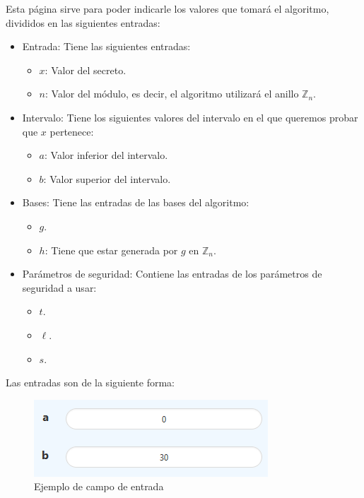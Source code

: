Esta página sirve para poder indicarle los valores que tomará el algoritmo, divididos en las siguientes entradas:
\begin{itemize}
    \item Entrada: Tiene las siguientes entradas:
    \begin{itemize}
        \item $x$: Valor del secreto.
        \item $n$: Valor del módulo, es decir, el algoritmo utilizará el anillo $\mathbb{Z}_{n}$.
    \end{itemize}
    \item Intervalo: Tiene los siguientes valores del intervalo en el que queremos probar que $x$ pertenece:
    \begin{itemize}
        \item $a$: Valor inferior del intervalo.
        \item $b$: Valor superior del intervalo.
    \end{itemize}
    \item Bases: Tiene las entradas de las bases del algoritmo:
    \begin{itemize}
        \item $g$.
        \item $h$: Tiene que estar generada por $g$ en $\mathbb{Z}_{n}$.
    \end{itemize}
    \item Parámetros de seguridad: Contiene las entradas de los parámetros de seguridad a usar:
    \begin{itemize}
        \item $t$.
        \item $\ell$.
        \item $s$.
    \end{itemize}
\end{itemize}

Las entradas son de la siguiente forma:
\begin{figure}[H]
    \centering
    \includegraphics[width=0.5\linewidth]{images/anexoA/input_box.png}
    \captionsetup{labelformat=empty}
    \caption{Ejemplo de campo de entrada}
    \label{im:input_box}
\end{figure}

